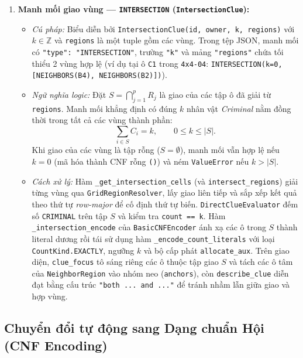\documentclass[12pt,a4paper]{article}
\begin{document}
\begin{enumerate}
    \item \textbf{Manh mối giao vùng --- \texttt{INTERSECTION} (\texttt{IntersectionClue}):}
    \begin{itemize}
        \item \emph{Cú pháp:} Biểu diễn bởi \texttt{IntersectionClue(id, owner, k, regions)} với $k \in \mathbb{Z}$ và \texttt{regions} là một tuple gồm các vùng. Trong tệp JSON, manh mối có \texttt{"type": "INTERSECTION"}, trường \texttt{"k"} và mảng \texttt{"regions"} chứa tối thiểu 2 vùng hợp lệ (ví dụ tại ô \texttt{C1} trong \texttt{4x4-04}: \texttt{INTERSECTION(k=0, [NEIGHBORS(B4), NEIGHBORS(B2)])}).
        \item \emph{Ngữ nghĩa logic:} Đặt $S = \bigcap_{j=1}^{p} R_j$ là giao của các tập ô đã giải từ \texttt{regions}. Manh mối khẳng định có đúng $k$ nhân vật \emph{Criminal} nằm đồng thời trong tất cả các vùng thành phần:
        \[
        \sum_{i \in S} C_i = k, \qquad 0 \le k \le |S|.
        \]
        Khi giao của các vùng là tập rỗng ($S = \emptyset$), manh mối vẫn hợp lệ nếu $k = 0$ (mã hóa thành CNF rỗng \texttt{()}) và ném \texttt{ValueError} nếu $k > |S|$.
        \item \emph{Cách xử lý:} Hàm \texttt{\_get\_intersection\_cells} (và \texttt{intersect\_regions}) giải từng vùng qua \texttt{GridRegionResolver}, lấy giao liên tiếp và sắp xếp kết quả theo thứ tự \emph{row-major} để cố định thứ tự biến. \texttt{DirectClueEvaluator} đếm số \texttt{CRIMINAL} trên tập $S$ và kiểm tra \texttt{count == k}. Hàm \texttt{\_intersection\_encode} của \texttt{BasicCNFEncoder} ánh xạ các ô trong $S$ thành literal dương rồi tái sử dụng hàm \texttt{\_encode\_count\_literals} với loại \texttt{CountKind.EXACTLY}, ngưỡng $k$ và bộ cấp phát \texttt{allocate\_aux}. Trên giao diện, \texttt{clue\_focus} tô sáng riêng các ô thuộc tập giao $S$ và tách các ô tâm của \texttt{NeighborRegion} vào nhóm neo (\texttt{anchors}), còn \texttt{describe\_clue} diễn đạt bằng cấu trúc \texttt{"both ... and ..."} để tránh nhầm lẫn giữa giao và hợp vùng.
    \end{itemize}
\end{enumerate}

    \subsection{Chuyển đổi tự động sang Dạng chuẩn Hội (CNF Encoding)}
\end{document}
